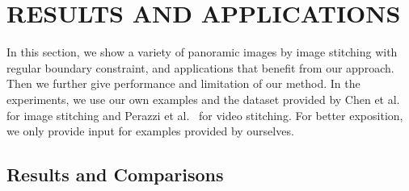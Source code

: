 \documentclass[10pt,journal,compsoc]{IEEEtran}
\begin{document}
\begin{comment}
Based on the piecewise rectangular boundary, we further optimize our image stitching by iterative optimization, as shown in Algorithm~\ref{alg:piecewise_rectangling}.
We first redefine the energy term $\phi_r$  in Equ.~\ref{equ:content_preserving_stitching} using the piecewise rectangular boundary constraint as
\begin{equation} \label{equ:piecewise_boundary}
\begin{split}
   &\widetilde{\phi_r}(\mathbf{V})=\sum\limits_{i=1}^4\sum\limits_{S^i_j \in \Re(i)}\sum\limits_{V_k \in S^i_j}|| \Lambda_{01}^i[\zeta[V_k] V_k+(1-\zeta[V_k])\\
   &(\kappa[V_k] \cdot \eta[V_k])]-S^i_j.val ||^2
\end{split}
\end{equation}

Then the energy function for rectangling stitching is redefined as
\begin{equation} \label{equ:piecewise_stitching}
\widetilde{\Phi}(\textbf{V})=\Phi_{stitch}(\textbf{V})+\gamma_r \widetilde{\phi_r}(\textbf{V})+\gamma_l \phi_l(\textbf{V}),
\end{equation}

\end{comment}

 \section{RESULTS AND APPLICATIONS}

In this section, we show a variety of panoramic images by image stitching with regular boundary constraint, and applications that benefit from our approach.
Then we further give performance and limitation of our method.
In the experiments, we use our own examples and the dataset provided by Chen et al.~\cite{conf/eccv/ChenC16} for image stitching and Perazzi et al.~\cite{journals/cgf/PerazziSZKWWG15} for video stitching. For better exposition, we only provide input for examples provided by ourselves.

 \subsection{Results and Comparisons}
\end{document}
